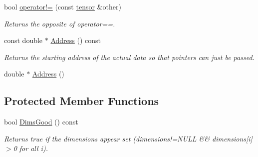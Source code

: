 \begin{DoxyCompactItemize}
bool \hyperlink{classJKBuilder_1_1tensor_a9b42dd835ddf2eb1a26b5d525b59b2b8}{operator!=} (const \hyperlink{classJKBuilder_1_1tensor}{tensor} \&other)
\begin{DoxyCompactList}\small\item\em Returns the opposite of operator==. \item\end{DoxyCompactList}\item 
const double $\ast$ \hyperlink{classJKBuilder_1_1tensor_a6a4e024f566d3bf9ba32a349afc5bbcf}{Address} () const 
\begin{DoxyCompactList}\small\item\em Returns the starting address of the actual data so that pointers can just be passed. \item\end{DoxyCompactList}\item 
double $\ast$ \hyperlink{classJKBuilder_1_1tensor_ac982d9eb84092bfc13694448dd824cbc}{Address} ()
\end{DoxyCompactItemize}
\subsection*{Protected Member Functions}
\begin{DoxyCompactItemize}
\item 
bool \hyperlink{classJKBuilder_1_1tensor_a6e72344440b411f433eb50171648c2d0}{DimsGood} () const 
\begin{DoxyCompactList}\small\item\em Returns true if the dimensions appear set (dimensions!=NULL \&\& dimensions\mbox{[}i\mbox{]}$>$0 for all i). \item\end{DoxyCompactList}\end{DoxyCompactItemize}
